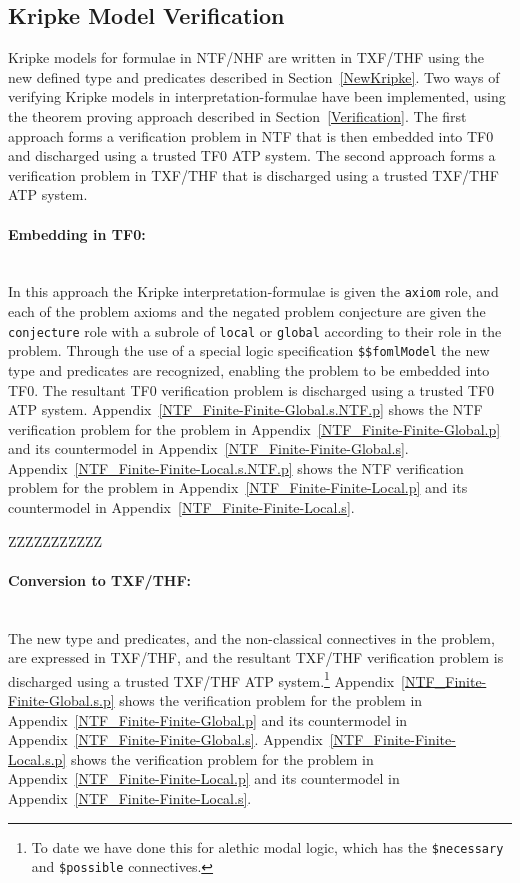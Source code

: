 \documentclass{easychair}
\begin{document}
\subsection{Kripke Model Verification}
\label{KripkeVerification}

Kripke models for formulae in NTF/NHF are written in TXF/THF using the new defined type and
predicates described in Section~\ref{NewKripke}.
Two ways of verifying Kripke models in interpretation-formulae have been implemented, using the 
theorem proving approach described in Section~\ref{Verification}.
The first approach forms a verification problem in NTF that is then embedded into TF0 and
discharged using a trusted TF0 ATP system.
The second approach forms a verification problem in TXF/THF that is discharged using a trusted 
TXF/THF ATP system.

\paragraph{Embedding in TF0:}~\\
In this approach the Kripke interpretation-formulae is given the {\tt axiom} role, and
each of the problem axioms and the negated problem conjecture are given the {\tt conjecture} role
with a subrole of {\tt local} or {\tt global} according to their role in the problem.
Through the use of a special logic specification {\tt \$\$fomlModel} the new type and predicates
are recognized, enabling the problem to be embedded into TF0.
The resultant TF0 verification problem is discharged using a trusted TF0 ATP system.
Appendix~\ref{NTF_Finite-Finite-Global.s.NTF.p} shows the NTF verification problem for the problem
in Appendix~\ref{NTF_Finite-Finite-Global.p} and its countermodel in
Appendix~\ref{NTF_Finite-Finite-Global.s}.
Appendix~\ref{NTF_Finite-Finite-Local.s.NTF.p} shows the NTF verification problem for the problem
in Appendix~\ref{NTF_Finite-Finite-Local.p} and its countermodel in
Appendix~\ref{NTF_Finite-Finite-Local.s}.

ZZZZZZZZZZZ

\paragraph{Conversion to TXF/THF:}~\\
The new type and predicates, and the non-classical connectives in the problem, are expressed 
in TXF/THF, and the resultant TXF/THF verification problem is discharged using a trusted TXF/THF 
ATP system.\footnote{%
To date we have done this for alethic modal logic, which has the {\tt \$necessary} and 
{\tt \$possible} connectives.}
Appendix~\ref{NTF_Finite-Finite-Global.s.p} shows the verification problem for the problem
in Appendix~\ref{NTF_Finite-Finite-Global.p} and its countermodel in 
Appendix~\ref{NTF_Finite-Finite-Global.s}.
Appendix~\ref{NTF_Finite-Finite-Local.s.p} shows the verification problem for the problem
in Appendix~\ref{NTF_Finite-Finite-Local.p} and its countermodel in 
Appendix~\ref{NTF_Finite-Finite-Local.s}.
\end{document}
